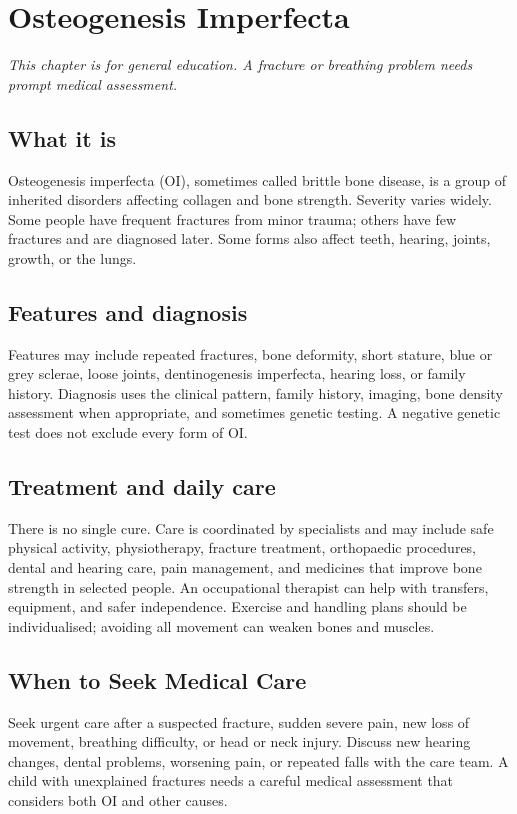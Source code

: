 \chapter{Osteogenesis Imperfecta}

\medskip
\noindent\textit{This chapter is for general education. A fracture or breathing problem needs prompt medical assessment.}

\section*{What it is}
Osteogenesis imperfecta (OI), sometimes called brittle bone disease, is a group of inherited disorders affecting collagen and bone strength. Severity varies widely. Some people have frequent fractures from minor trauma; others have few fractures and are diagnosed later. Some forms also affect teeth, hearing, joints, growth, or the lungs.

\section*{Features and diagnosis}
Features may include repeated fractures, bone deformity, short stature, blue or grey sclerae, loose joints, dentinogenesis imperfecta, hearing loss, or family history. Diagnosis uses the clinical pattern, family history, imaging, bone density assessment when appropriate, and sometimes genetic testing. A negative genetic test does not exclude every form of OI.

\section*{Treatment and daily care}
There is no single cure. Care is coordinated by specialists and may include safe physical activity, physiotherapy, fracture treatment, orthopaedic procedures, dental and hearing care, pain management, and medicines that improve bone strength in selected people. An occupational therapist can help with transfers, equipment, and safer independence. Exercise and handling plans should be individualised; avoiding all movement can weaken bones and muscles.

\section*{When to Seek Medical Care}
Seek urgent care after a suspected fracture, sudden severe pain, new loss of movement, breathing difficulty, or head or neck injury. Discuss new hearing changes, dental problems, worsening pain, or repeated falls with the care team. A child with unexplained fractures needs a careful medical assessment that considers both OI and other causes.


